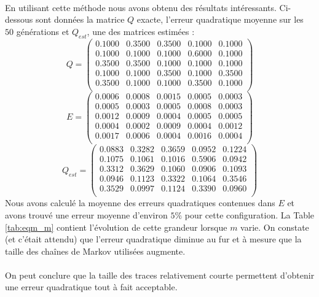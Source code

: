 \documentclass[a4paper,titlepage]{report}
\begin{document}
\paragraph{}
En utilisant cette méthode nous avons obtenu des résultats intéressants. Ci-dessous sont données la matrice $Q$ exacte, l'erreur quadratique moyenne sur les $50$ générations et $Q_{est}$, une des matrices estimées :
\[
Q = 
\begin{pmatrix}
0.1000 & 0.3500 & 0.3500 & 0.1000 & 0.1000\\
0.1000 & 0.1000 & 0.1000 & 0.6000 & 0.1000\\
0.3500 & 0.3500 & 0.1000 & 0.1000 & 0.1000\\
0.1000 & 0.1000 & 0.3500 & 0.1000 & 0.3500\\
0.3500 & 0.1000 & 0.1000 & 0.3500 & 0.1000\\
\end{pmatrix}
\]
\[
E = 
\begin{pmatrix}
0.0006 & 0.0008 & 0.0015 & 0.0005 & 0.0003\\
0.0005 & 0.0003 & 0.0005 & 0.0008 & 0.0003\\
0.0012 & 0.0009 & 0.0004 & 0.0005 & 0.0005\\
0.0004 & 0.0002 & 0.0009 & 0.0004 & 0.0012\\
0.0017 & 0.0006 & 0.0004 & 0.0016 & 0.0004\\
\end{pmatrix}
\]
\[
Q_{est} = 
\begin{pmatrix}
0.0883 & 0.3282 & 0.3659 & 0.0952 & 0.1224\\
0.1075 & 0.1061 & 0.1016 & 0.5906 & 0.0942\\
0.3312 & 0.3629 & 0.1060 & 0.0906 & 0.1093\\
0.0946 & 0.1123 & 0.3322 & 0.1064 & 0.3546\\
0.3529 & 0.0997 & 0.1124 & 0.3390 & 0.0960\\
\end{pmatrix}
\]
Nous avons calculé la moyenne des erreurs quadratiques contenues dans $E$ et avons trouvé une erreur moyenne d'environ $5\%$ pour cette configuration. La Table \ref{tab:eqm_m} contient l'évolution de cette grandeur lorsque $m$ varie. On constate (et c'était attendu) que l'erreur quadratique diminue au fur et à mesure que la taille des chaînes de Markov utilisées augmente. 
\paragraph{}
On peut conclure que la taille des traces relativement courte permettent d'obtenir une erreur quadratique tout à fait acceptable.
\end{document}
